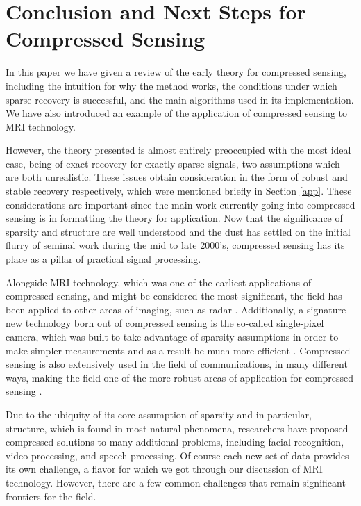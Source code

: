 \documentclass[12pt,a4paper]{amsart}
\numberwithin{equation}{section}
\theoremstyle{plain}
\theoremstyle{definition}
\begin{document}
\section{Conclusion and Next Steps for Compressed Sensing}

In this paper we have given a review of the early theory for compressed sensing, including the intuition for why the method works, the conditions under which sparse recovery is successful, and the main algorithms used in its implementation. We have also introduced an example of the application of compressed sensing to MRI technology. 

However, the theory presented is almost entirely preoccupied with the most ideal case, being of exact recovery for exactly sparse signals, two assumptions which are both unrealistic. These issues obtain consideration in the form of robust and stable recovery respectively, which were mentioned briefly in Section \ref{app}. These considerations are important since the main work currently going into compressed sensing is in formatting the theory for application. Now that the significance of sparsity and structure are well understood and the dust has settled on the initial flurry of seminal work during the mid to late 2000's, compressed sensing has its place as a pillar of practical signal processing.

Alongside MRI technology, which was one of the earliest applications of compressed sensing, and might be considered the most significant, the field has been applied to other areas of imaging, such as radar \cite{yang}. Additionally, a signature new technology born out of compressed sensing is the so-called single-pixel camera, which was built to take advantage of sparsity assumptions in order to make simpler measurements and as a result be much more efficient \cite{duarte}. Compressed sensing is also extensively used in the field of communications, in many different ways, making the field one of the more robust areas of application for compressed sensing \cite{choi}.

Due to the ubiquity of its core assumption of sparsity and in particular, structure, which is found in most natural phenomena, researchers have proposed compressed solutions to many additional problems, including facial recognition, video processing, and speech processing. Of course each new set of data provides its own challenge, a flavor for which we got through our discussion of MRI technology. However, there are a few common challenges that remain significant frontiers for the field.
\end{document}
